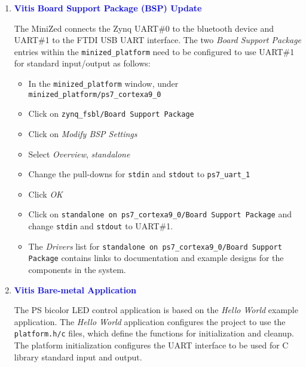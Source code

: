 \begin{enumerate}
\newpage
\item \textcolor{blue}{\textbf{Vitis Board Support Package (BSP) Update}}

The MiniZed connects the Zynq UART\#0 to the bluetooth device and UART\#1 to the
FTDI USB UART interface. The two \emph{Board Support Package} entries within
the \verb+minized_platform+ need to be configured to use UART\#1 for standard 
input/output as follows:
%
\begin{itemize}
\item In the \verb+minized_platform+ window, under \verb+minized_platform/ps7_cortexa9_0+
\item Click on \verb+zynq_fsbl/Board Support Package+
\item Click on \emph{Modify BSP Settings}
\item Select \emph{Overview}, \emph{standalone}
\item Change the pull-downs for \texttt{stdin} and \texttt{stdout} to \texttt{ps7\_uart\_1}
\item Click \emph{OK}
\item Click on \verb+standalone on ps7_cortexa9_0/Board Support Package+
and change \texttt{stdin} and \texttt{stdout} to UART\#1.
\item The \emph{Drivers} list for
\verb+standalone on ps7_cortexa9_0/Board Support Package+
contains links to documentation and example designs for the components in 
the system.
\end{itemize}

\item \textcolor{blue}{\textbf{Vitis Bare-metal Application}}

The PS bicolor LED control application is based on the
\emph{Hello World} example application. The \emph{Hello World} application 
configures the project to use the \texttt{platform.h/c} files, which 
define the functions for initialization and cleanup. The platform 
initialization configures the UART interface to be used for C library 
standard input and output.


\end{enumerate}
